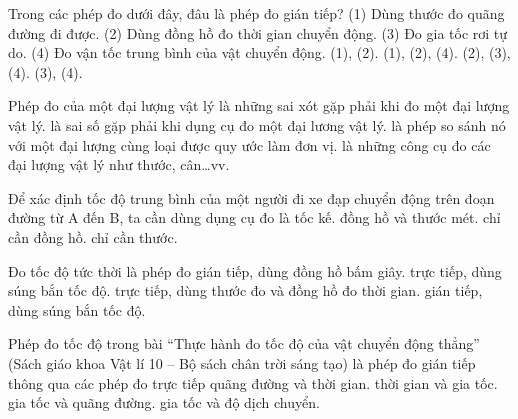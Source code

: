 \begin{ex}
Trong các phép đo dưới đây, đâu là phép đo gián tiếp?
(1) Dùng thước đo quãng đường đi được.
(2) Dùng đồng hồ đo thời gian chuyển động.
(3) Đo gia tốc rơi tự do.
(4) Đo vận tốc trung bình của vật chuyển động.
\choice
{(1), (2).}
{(1), (2), (4).}
{(2), (3), (4).}
{\True (3), (4).}
\end{ex}

\begin{ex}
Phép đo của một đại lượng vật lý
\choice
{là những sai xót gặp phải khi đo một đại lượng vật lý.}
{là sai số gặp phải khi dụng cụ đo một đại lương vật lý.}
{\True là phép so sánh nó với một đại lượng cùng loại được quy ước làm đơn vị.}
{là những công cụ đo các đại lượng vật lý như thước, cân…vv.}
\end{ex}

\begin{ex}
Để xác định tốc độ trung bình của một người đi xe đạp chuyển động trên đoạn đường từ A đến B, ta cần dùng dụng cụ đo là
\choice
{tốc kế.}
{\True đồng hồ và thước mét.}
{chỉ cần đồng hồ.}
{chỉ cần thước.}
\end{ex}

\begin{ex}
Đo tốc độ tức thời là phép đo
\choice
{gián tiếp, dùng đồng hồ bấm giây.}
{\True trực tiếp, dùng súng bắn tốc độ.}
{trực tiếp, dùng thước đo và đồng hồ đo thời gian.}
{gián tiếp, dùng súng bắn tốc độ.}
\end{ex}

\begin{ex}
Phép đo tốc độ trong bài “Thực hành đo tốc độ của vật chuyển động thẳng” (Sách giáo khoa Vật lí 10 – Bộ sách chân trời sáng tạo) là phép đo gián tiếp thông qua các phép đo trực tiếp
\choice
{\True quãng đường và thời gian.}
{thời gian và gia tốc.}
{gia tốc và quãng đường.}
{gia tốc và độ dịch chuyển.}
\end{ex}

